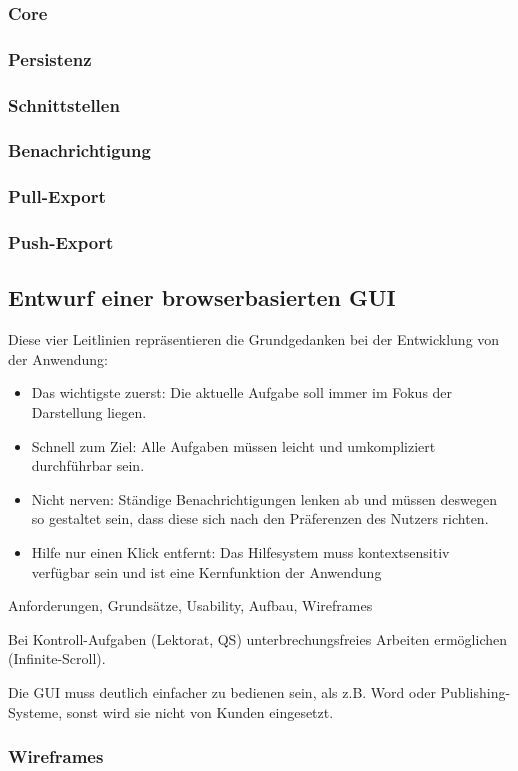 \subsubsection{Core}

\subsubsection{Persistenz}

\subsubsection{Schnittstellen}

\subsubsection{Benachrichtigung}

\subsubsection{Pull-Export}

\subsubsection{Push-Export}

\subsection{Entwurf einer browserbasierten GUI}\label{l:entwurf-gui}

Diese vier Leitlinien repräsentieren die Grundgedanken bei der Entwicklung von der Anwendung:

\begin{itemize}
\item{Das wichtigste zuerst: Die aktuelle Aufgabe soll immer im Fokus der Darstellung liegen.}
\item{Schnell zum Ziel: Alle Aufgaben müssen leicht und umkompliziert durchführbar sein.}
\item{Nicht nerven: Ständige Benachrichtigungen lenken ab und müssen deswegen so gestaltet sein, dass diese sich nach den Präferenzen des Nutzers richten.}
\item{Hilfe nur einen Klick entfernt: Das Hilfesystem muss kontextsensitiv verfügbar sein und ist eine Kernfunktion der Anwendung}
\end{itemize}

Anforderungen, Grundsätze, Usability, Aufbau, Wireframes

Bei Kontroll-Aufgaben (Lektorat, QS) unterbrechungsfreies Arbeiten ermöglichen (Infinite-Scroll).

Die GUI muss deutlich einfacher zu bedienen sein, als z.B. Word oder Publishing-Systeme, sonst wird sie nicht von Kunden eingesetzt.

\subsubsection{Wireframes}

